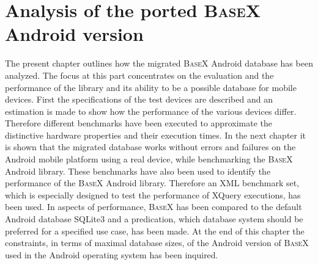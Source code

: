 \chapter{Analysis of the ported \textsc{BaseX} Android version}
\label{cha:analysis}
The present chapter outlines how the migrated \textsc{BaseX} Android database has been analyzed.
The focus at this part concentrates on the evaluation and the performance of the library and its ability to be a possible database for mobile devices.
First the specifications of the test devices are described and an estimation is made to show how the performance of the various devices differ.
Therefore different benchmarks have been executed to approximate the distinctive hardware properties and their execution times.
In the next chapter it is shown that the migrated database works without errors and failures on the Android mobile platform using a real device, while benchmarking the \textsc{BaseX} Android library.
These benchmarks have also been used to identify the performance of the \textsc{BaseX} Android library. 
Therefore an XML benchmark set, which is especially designed to test the performance of XQuery executions, has been used.
In aspects of performance, \textsc{BaseX} has been compared to the default Android database SQLite3 and a predication, which database system should be preferred for a specified use case, has been made.
At the end of this chapter the constraints, in terms of maximal database sizes, of the Android version of \textsc{BaseX} used in the Android operating system has been inquired.

